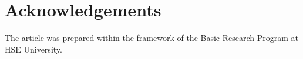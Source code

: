 \documentclass[reqno, 12pt, a4paper]{amsart}
\theoremstyle{plain}
\newtheorem{theorem}{Theorem}[section]
\theoremstyle{definition}
\begin{document}
%
%
%  
%
%
%
%
%


\section*{Acknowledgements}
The article was prepared within the framework of the Basic Research Program at HSE University.






  

\end{document}
